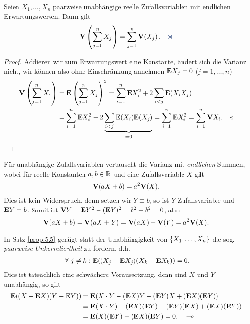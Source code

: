 \begin{prop}
\label{prop:5.5}
Seien $X_{1}, \ldots, X_{n}$ paarweise unabhängige reelle Zufallsvariablen mit
endlichen Erwartungswerten. Dann gilt
\begin{align*}
\V\left( \sum^ {n}_{j=1}X_{j}\right )=\sum^ {n}_{j=1} \V(X_{j})\, .\fishhere
\end{align*}
\end{prop}
\begin{proof}
Addieren wir zum Erwartungswert eine Konstante, ändert sich die Varianz nicht,
wir können also ohne Einschränkung annehmen $\textbf{E} X_j=0$ ($j=1,\ldots,n$).
\begin{align*}
\textbf{V}\left(\sum\limits_{j=1}^n X_j\right)
&= \textbf{E}\left(\sum_{j=1}^n X_j\right)^2
= \sum\limits_{i=1}^n \textbf{E} X_i^2 + 2\sum\limits_{i<j} \textbf{E}(X_iX_j)\\
&=\sum\limits_{i=1}^n \textbf{E} X_i^2 + 2\underbrace{\sum\limits_{i<j}
\textbf{E}(X_i)\textbf{E}(X_j)}_{=0} = \sum\limits_{i=1}^n \textbf{E} X_i^2
= \sum\limits_{i=1}^n \textbf{V} X_i.\quad\text{<<}
\end{align*}
\end{proof}

Für unabhängige Zufallsvariablen vertauscht die Varianz mit \textit{endlichen}
Summen, wobei für reelle Konstanten $a,b\in\mathbb{R}$ und eine Zufallsvariable $X$ gilt
\begin{align*}
\textbf{V}(aX +b) = a^2\textbf{V}(X).
\end{align*}
Dies ist kein Widerspruch, denn setzen wir $Y\equiv b$, so ist $Y$
Zufallsvariable und $\textbf{E} Y = b$. Somit ist $\textbf{V} Y = \textbf{E} Y^2 - (\textbf{E} Y)^2 = b^2 - b^2
= 0$, also
\begin{align*}
\textbf{V}(aX +b) = \textbf{V}(aX+Y) = \textbf{V}(aX)+\textbf{V}(Y) = a^2\textbf{V}(X).
\end{align*}

\begin{bem}
\label{bem:5.4}
In Satz \ref{prop:5.5} genügt statt der Unabhängigkeit von
$\left\{ X_{1},\ldots,X_{n} \right\}$ die sog. \emph{paarweise Unkorreliertheit} zu
fordern, d.h.
\begin{align*}
\forall{j\neq k} : \E((X_{j}-\E X_{j}) (X_{k}-\E X _{k}))=0.
\end{align*}
Dies ist tatsächlich eine schwächere Voraussetzung, denn sind $X$ und $Y$
unabhängig, so gilt
\begin{align*}
\textbf{E}((X-\textbf{E} X)(Y-\textbf{E} Y)) &= \textbf{E}(X\cdot Y - (\textbf{E} X)Y- (\textbf{E} Y)X + (\textbf{E} X)(\textbf{E} Y))\\
&= \textbf{E}(X\cdot Y) - (\textbf{E} X)(\textbf{E} Y) - (\textbf{E} Y)(\textbf{E} X) + (\textbf{E} X)(\textbf{E} Y))\\
&= \textbf{E}(X)(\textbf{E} Y) - (\textbf{E} X)(\textbf{E} Y) = 0.\quad\multimap
\end{align*}
\end{bem}

